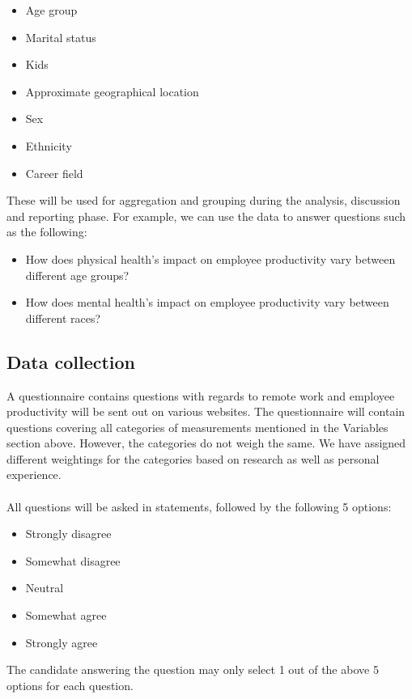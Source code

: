 \documentclass[12pt]{article}
\begin{document}
\begin{itemize}
  \item Age group 
  \item Marital status
  \item Kids
  \item Approximate geographical location
  \item Sex
  \item Ethnicity
  \item Career field
\end{itemize}
These will be used for aggregation and grouping during the analysis, discussion and reporting phase. For example, we can use the data to answer questions such as the following:
\begin{itemize}
  \item How does physical health’s impact on employee productivity vary between different age groups?
  \item How does mental health’s impact on employee productivity vary between different races?
\end{itemize}


\subsection*{Data collection}

A questionnaire contains questions with regards to remote work and employee productivity will be sent out on various websites. The questionnaire will contain questions covering all categories of measurements mentioned in the Variables section above. However, the categories do not weigh the same. We have assigned different weightings for the categories based on research as well as personal experience. \\ \\
All questions will be asked in statements, followed by the following 5 options: 
\begin{itemize}
  \item Strongly disagree
  \item Somewhat disagree
  \item Neutral
  \item Somewhat agree
  \item Strongly agree
\end{itemize}
The candidate answering the question may only select 1 out of the above 5 options for each question. 
\end{document}
